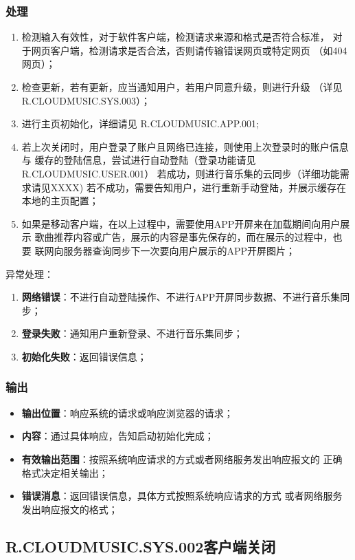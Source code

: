 \subsubsection{处理}
	\begin{enumerate}
		\item 检测输入有效性，对于软件客户端，检测请求来源和格式是否符合标准，
			对于网页客户端，检测请求是否合法，否则请传输错误网页或特定网页
			（如404网页）；
		\item 检查更新，若有更新，应当通知用户，若用户同意升级，则进行升级
			（详见R.CLOUDMUSIC.SYS.003）；
		\item 进行主页初始化，详细请见 R.CLOUDMUSIC.APP.001;
		\item 若上次关闭时，用户登录了账户且网络已连接，则使用上次登录时的账户信息与
			缓存的登陆信息，尝试进行自动登陆（登录功能请见R.CLOUDMUSIC.USER.001）
			若成功，则进行音乐集的云同步（详细功能需求请见XXXX)
			若不成功，需要告知用户，进行重新手动登陆，并展示缓存在本地的主页配置；
		\item 如果是移动客户端，在以上过程中，需要使用APP开屏来在加载期间向用户展示
			歌曲推荐内容或广告，展示的内容是事先保存的，而在展示的过程中，也要
			联网向服务器查询同步下一次要向用户展示的APP开屏图片；
	\end{enumerate}
	\noindent 异常处理：
	\begin{enumerate}
		\item \textbf{网络错误}：不进行自动登陆操作、不进行APP开屏同步数据、不进行音乐集同步；
		\item \textbf{登录失败}：通知用户重新登录、不进行音乐集同步；
		\item \textbf{初始化失败}：返回错误信息；
	\end{enumerate}
\subsubsection{输出}
\begin{itemize}
	\item \textbf{输出位置}：响应系统的请求或响应浏览器的请求；
	\item \textbf{内容}：通过具体响应，告知启动初始化完成；
	\item \textbf{有效输出范围}：按照系统响应请求的方式或者网络服务发出响应报文的
		正确格式决定相关输出；
	\item \textbf{错误消息}：返回错误信息，具体方式按照系统响应请求的方式
		或者网络服务发出响应报文的格式；
\end{itemize}

\subsection{R.CLOUDMUSIC.SYS.002客户端关闭}
